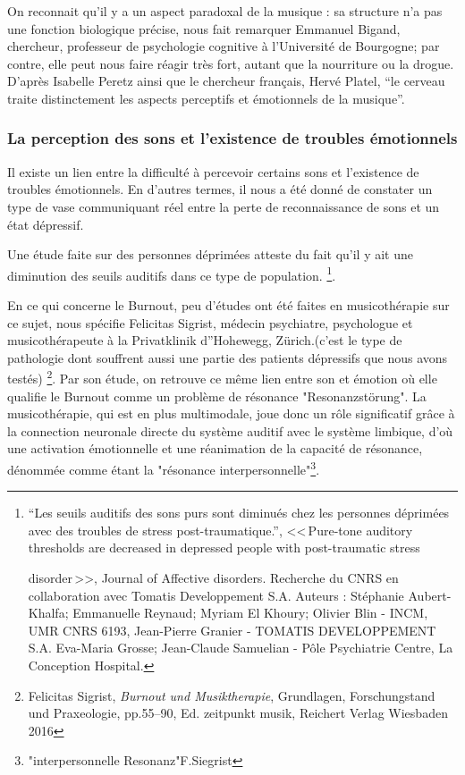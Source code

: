 On reconnait qu'il y a un aspect paradoxal de la musique : sa structure n'a pas une 
fonction biologique précise, nous fait remarquer Emmanuel Bigand,  chercheur, professeur 
de psychologie cognitive à l'Université 
de Bourgogne; par contre, elle peut nous faire réagir très fort, autant que la nourriture ou la 
drogue. \autocite[Voir ch. 3 p. 35, "Vous avez l'oreille musicale"]{bigand:cerveau}
D'après Isabelle Peretz
\autocite[<<\,Les agnosies auditives\,>>, pp. 205--216]{seron.baron.ea:neuropsychologie}
ainsi que le chercheur français, Hervé Platel,%
\autocite[pp. 223--224]{platel_neuropsychology_2002}
 \enquote{le cerveau traite distinctement les aspects perceptifs et émotionnels de la 
 musique}.




\subsubsection{La perception des sons et l'existence de troubles
  émotionnels}

Il existe un lien entre la difficulté à percevoir certains sons 
et l'existence 
de troubles émotionnels. En d'autres termes, il nous a été donné de
constater un type de vase communiquant réel entre la perte de reconnaissance de sons et
un état dépressif.


Une étude faite sur des personnes déprimées atteste du 
fait qu'il y ait une diminution des seuils auditifs dans ce type de population. 
\footnote{``Les seuils auditifs des sons purs 
	sont diminués chez les personnes déprimées avec des
	troubles de stress post-traumatique.'', <<\,Pure-tone auditory 
	thresholds are decreased in depressed people with post-traumatic stress 



	disorder\,>>, Journal of Affective disorders. Recherche du CNRS en collaboration
	avec Tomatis Developpement S.A. Auteurs : Stéphanie 
	Aubert-Khalfa; Emmanuelle Reynaud; Myriam El Khoury;
	Olivier Blin - INCM, UMR CNRS 6193, Jean-Pierre Granier -
	TOMATIS DEVELOPPEMENT S.A. Eva-Maria Grosse; Jean-Claude 
	Samuelian - Pôle Psychiatrie Centre, La Conception Hospital.}.



En ce qui concerne le Burnout,  peu d'études ont été  faites en musicothérapie
sur ce sujet, nous spécifie Felicitas Sigrist, médecin
psychiatre, psychologue et musicothérapeute à la Privatklinik
d''Hohewegg, Zürich.(c'est le type de pathologie dont souffrent aussi 
une partie des patients dépressifs  que nous avons testés) \footnote{Felicitas Sigrist,  
\textit{Burnout und 
		Musiktherapie}, Grundlagen, Forschungstand und Praxeologie, pp.55--90, Ed. 
	zeitpunkt musik, Reichert Verlag Wiesbaden 2016}. Par son étude, on retrouve ce 
	même lien entre son et 
émotion où elle qualifie le Burnout comme un problème de résonance "Resonanzstörung". La 
musicothérapie, qui est en plus multimodale, joue donc un rôle significatif grâce à la 
connection 
neuronale directe du système auditif avec le système limbique, d'où une activation 
émotionnelle et une  réanimation de  la capacité de résonance, dénommée comme 
étant la 
"résonance interpersonnelle"\footnote{"interpersonnelle Resonanz"F.Siegrist}.

